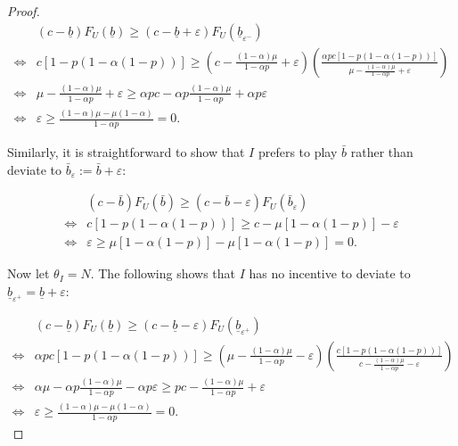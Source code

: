 \documentclass[11pt]{article}
\theoremstyle{plain}
\theoremstyle{definition}
\theoremstyle{plain}
\theoremstyle{plain}
\theoremstyle{plain}
\theoremstyle{plain}
\numberwithin{equation}{section}
\begin{document}
\begin{proof}
\vspace{-0.2cm}

\begin{align*}
    &  \left(c - \underline{b} \right) F_U (\underline{b}) \geq \left(c - \underline{b} + \varepsilon \right) F_U (\underline{b}_{\varepsilon^-})\\[8pt]
    \iff & c\left[1-p\left( 1-\alpha(1-p)\right) \right] \geq \left(c - \frac{(1-\alpha)\mu}{1-\alpha p} + \varepsilon \right) \left( \frac{\alpha p c\left[1-p\left( 1-\alpha(1-p)\right) \right]}{\mu - \frac{(1-\alpha)\mu}{1-\alpha p} + \varepsilon} \right) \\[8pt]
    \iff & \mu - \frac{(1-\alpha)\mu}{1-\alpha p} + \varepsilon \geq \alpha p  c - \alpha p  \frac{(1-\alpha)\mu}{1-\alpha p} + \alpha p  \varepsilon \\[8pt]
    \iff & \varepsilon \geq \frac{(1-\alpha)\mu - \mu(1-\alpha)}{1-\alpha p} = 0.
\end{align*}

\vspace{4mm}

\noindent Similarly, it is straightforward to show that $ I $ prefers to play $\bar{b}$ rather than deviate to $\bar{b}_\varepsilon := \bar{b} + \varepsilon$:

\vspace{-0.2cm}

\begin{align*}
    &  \left(c - \bar{b} \right) F_U (\bar{b}) \geq \left(c - \bar{b} - \varepsilon \right) F_U (\bar{b}_\varepsilon)\\[8pt]
    \iff & c\left[1-p\left( 1-\alpha(1-p)\right) \right] \geq c - \mu\left[ 1-\alpha(1-p)\right] - \varepsilon\\[8pt]
    \iff & \varepsilon \geq \mu\left[ 1-\alpha(1-p)\right] - \mu\left[ 1-\alpha(1-p)\right] = 0.
\end{align*}

\vspace{4mm}

\noindent Now let $ \theta_I = N $. The following shows that $ I $ has no incentive to deviate to $ \underline{b}_{\varepsilon^+} = \underline{b} + \varepsilon $:

\vspace{-0.2cm}

\begin{align*}
     &  \left(c - \underline{b} \right) F_U (\underline{b}) \geq \left(c - \underline{b} - \varepsilon \right) F_U (\underline{b}_{\varepsilon^+})\\[8pt]
    \iff & \alpha p c\left[1-p\left( 1-\alpha(1-p)\right) \right] \geq \left(\mu - \frac{(1-\alpha)\mu}{1-\alpha p} - \varepsilon \right) \left( \frac{c\left[1-p\left( 1-\alpha(1-p)\right) \right]}{c - \frac{(1-\alpha)\mu}{1-\alpha p} - \varepsilon} \right) \\[8pt]
    \iff & \alpha \mu - \alpha p \frac{(1-\alpha)\mu}{1-\alpha p} - \alpha p\varepsilon \geq p  c - \frac{(1-\alpha)\mu}{1-\alpha p} + \varepsilon \\[8pt]
    \iff & \varepsilon \geq \frac{(1-\alpha)\mu - \mu(1-\alpha)}{1-\alpha p} = 0.
\end{align*}


\end{proof}
\end{document}
